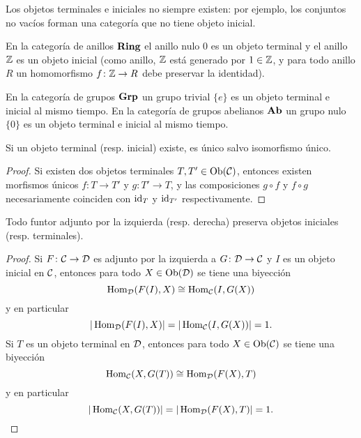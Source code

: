 \documentclass{article}
\numberwithin{equation}{section}
\theoremstyle{definition}
\begin{document}
Los objetos terminales e iniciales no siempre existen: por ejemplo, los
conjuntos no vacíos forman una categoría que no tiene objeto inicial.

\begin{ejemplo}
  En la categoría de anillos $\text{\bf Ring}$ el anillo nulo $0$ es un objeto
  terminal y el anillo $\mathbb{Z}$ es un objeto inicial (como anillo, $\mathbb{Z}$ está
  generado por $1\in \mathbb{Z}$, y para todo anillo $R$ un homomorfismo
  $f\colon \mathbb{Z} \to R$ debe preservar la identidad).
\end{ejemplo}

\begin{ejemplo}
  En la categoría de grupos $\text{\bf Grp}$ un grupo trivial $\{ e \}$ es un
  objeto terminal e inicial al mismo tiempo. En la categoría de grupos abelianos
  $\text{\bf Ab}$ un grupo nulo $\{ 0 \}$ es un objeto terminal e inicial al mismo
  tiempo.
\end{ejemplo}

\begin{observacion}
  Si un objeto terminal (resp. inicial) existe, es único salvo isomorfismo
  único.

  \begin{proof}
    Si existen dos objetos terminales $T, T' \in \operatorname{Ob} (\mathcal{C})$, entonces
    existen morfismos únicos $f\colon T \to T'$ y $g\colon T'\to T$, y las
    composiciones $g\circ f$ y $f\circ g$ necesariamente coinciden con $\mathrm{id}_{T}$ y
    $\mathrm{id}_{T'}$ respectivamente.
  \end{proof}
\end{observacion}

\begin{observacion}
  Todo funtor adjunto por la izquierda (resp. derecha) preserva objetos
  iniciales (resp. terminales).

  \begin{proof}
    Si $F\colon \mathcal{C}\to \mathcal{D}$ es adjunto por la izquierda a
    $G\colon \mathcal{D}\to \mathcal{C}$ y $I$ es un objeto inicial en
    $\mathcal{C}$, entonces para todo $X\in \operatorname{Ob} (\mathcal{D})$ se tiene una
    biyección
    $$\operatorname{Hom}_\mathcal{D} (F (I), X) \cong \operatorname{Hom}_\mathcal{C} (I, G (X))$$
    y en particular
    $$|\operatorname{Hom}_\mathcal{D} (F (I), X)| = |\operatorname{Hom}_\mathcal{C} (I, G (X))| = 1.$$
    Si $T$ es un objeto terminal en $\mathcal{D}$, entonces para todo
    $X\in \operatorname{Ob} (\mathcal{C})$ se tiene una biyección
    $$\operatorname{Hom}_\mathcal{C} (X, G (T)) \cong \operatorname{Hom}_\mathcal{D} (F (X), T)$$
    y en particular
    \[ |\operatorname{Hom}_\mathcal{C} (X, G (T))| = |\operatorname{Hom}_\mathcal{D} (F (X), T)| = 1. \qedhere \]
  \end{proof}
\end{observacion}
\end{document}
